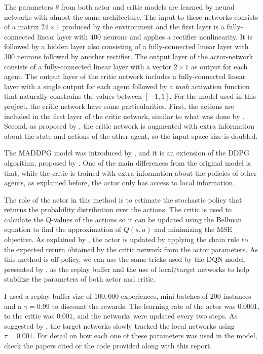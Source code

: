 \documentclass[a4paper]{article}
\begin{document}
 The parameters $\theta$ from both actor and critic models are learned by neural networks with almost the same architecture. The input to these networks consists of a matrix $24 \times 1$ produced by the environment and the first layer is a fully-connected linear layer with $400$ neurons and applies a rectifier nonlinearity. It is followed by a hidden layer also consisting of a fully-connected linear layer with $300$ neurons followed by another rectifier. The output layer of the actor-network consists of a fully-connected linear layer with a vector $2\times1$ as output for each agent. The output layer of the critic network includes a fully-connected linear layer with a single output for each agent followed by a \textit{tanh} activation function that naturally constrains the values between $[-1, 1]$. For the model used in this project, the critic network have some particularities. First, the actions are included in the first layer of the critic network, similar to what was done by \cite{Lillicrap:2015ww}. Second, as proposed by  \cite{NIPS2017_7217}, the critic network is augmented with extra information about the state and actions of the other agent, so the input space size is doubled.

The MADDPG model was introduced by \cite{NIPS2017_7217}, and it is an extension of the DDPG algorithm, proposed by \cite{Lillicrap:2015ww}. One of the main differences from the original model is that, while the critic is trained with extra information about the policies of other agents, as explained before, the actor only has access to local information.

The role of the actor in this method is to estimate the stochastic policy that returns the probability distribution over the actions. The critic is used to calculate the Q-values of the actions so it can be updated using the Bellman equation to find the approximation of $Q(s, a)$ and minimizing the MSE objective. As explained by \cite{Lillicrap:2015ww}, the actor is updated by applying the chain rule to the expected return obtained by the critic network from the actor parameters. As this method is off-policy, we can use the same tricks used by the DQN model, presented by \cite{mnih2015humanlevel}, as the replay buffer and the use of local/target networks to help stabilize the parameters of both actor and critic.

I used a replay buffer size of $100,000$ experiences, mini-batches of $200$ instances and a $\gamma=0.99$ to discount the rewards. The learning rate of the actor was $0.0001$, to the critic was $0.001$, and the networks were updated every two steps. As suggested by \cite{Lillicrap:2015ww}, the target networks slowly tracked the local networks using $\tau=0.001$. For detail on how each one of these parameters was used in the model, check the papers cited or the code provided along with this report.
\end{document}
